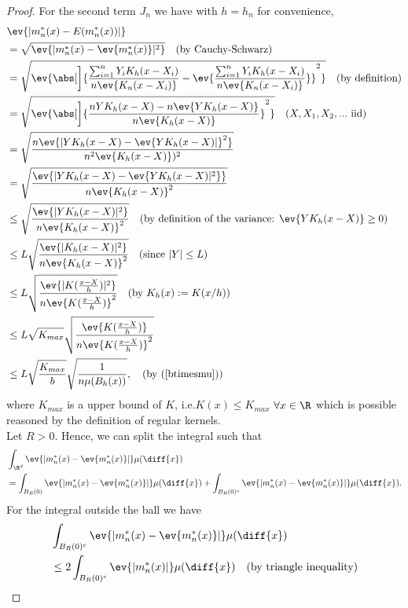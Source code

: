 \begin{proof}
    For the second term $J_n$ we have with $h = h_n$ for convenience,
    \begin{align*}
        &\ev{|m_n^*(x)-E(m_n^*(x))|} \\
        &= \sqrt{\ev{|m_n^*(x)-\ev{m_n^*(x)}|^2}} \quad\text{(by Cauchy-Schwarz)} \\
        &= \sqrt{\ev{\abs[\bigg]{\frac{\sum_{i=1}^n Y_i K_h(x-X_i)}{n\ev{K_n(x-X_i)}} - \ev{\frac{\sum_{i=1}^n Y_i K_h(x-X_i)}{n\ev{K_n(x-X_i)}}}}^2}} \quad\text{(by definition)}\\
        &=\sqrt{\ev{\abs[\bigg]{\frac{nYK_h(x-X)-n\ev{YK_h(x-X)}}{n\ev{K_h(x-X)}}}^2}} \quad\text{($X,X_1,X_2,...$ iid)} \\
        &=\sqrt{\frac{n \ev{|YK_h(x-X)-\ev{YK_h(x-X)|}^2}}{n^2 \ev{K_h(x-X)})^2}} \\ 
        &=\sqrt{\frac{\ev{|YK_h(x-X)-\ev{YK_h(x-X)|^2}}}{n \ev{K_h(x-X)}^2}} \\ 
        &\leq \sqrt{\frac{\ev{|YK_h(x-X)|^2}}{n \ev{K_h(x-X)}^2}} \quad\text{(by definition of the variance: $\ev{YK_h(x-X)} \geq 0$)} \\
        &\leq L \sqrt{\frac{\ev{|K_h(x-X)|^2}}{n \ev{K_h(x-X)}^2}} \quad\text{(since $|Y|\leq L$)}\\
        &\leq L \sqrt{\frac{\ev{|K(\frac{x-X}{h})|^2}}{n \ev{K(\frac{x-X}{h})}^2}} \quad\text{(by $K_h(x):= K(x/h)$)}\\
        &\leq L \sqrt{K_{max}} \sqrt{\frac{\ev{K(\frac{x-X}{h})}}{n \ev{K(\frac{x-X}{h})}^2}} \\
        &\leq L \sqrt{\frac{K_{max}}{b}} \sqrt{\frac{1}{n\mu (B_h(x))}}, \quad\text{(by (\ref{btimesmu}))}
    \end{align*}
    where $K_{max}$ is a upper bound of $K$, i.e.\@ $K(x) \leq K_{max}$ $\forall x \in \R$ which is possible reasoned by the definition of regular kernels. \\
    Let $R>0$. Hence, we can split the integral such that
    \begin{align*}
        &\int_{\R^d} \ev{|m_n^*(x)-\ev{m_n^*(x)}|} \mu(\diff{x}) \\
        &= \int_{B_R(0)} \ev{|m_n^*(x)-\ev{m_n^*(x)}|} \mu(\diff{x}) + \int_{B_R(0)^c} \ev{|m_n^*(x)-\ev{m_n^*(x)}|} \mu(\diff{x}).
    \end{align*}
    For the integral outside the ball we have 
    \begin{align*}
        &\int_{B_R(0)^c} \ev{|m_n^*(x)-\ev{m_n^*(x)}|} \mu(\diff{x}) \\
        &\leq 2 \int_{B_R(0)^c} \ev{|m_n^*(x)|} \mu(\diff{x}) \quad\text{(by triangle inequality)}\\ 

\end{align*}
\end{proof}
